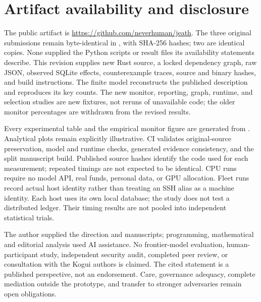\section*{Artifact availability and disclosure}
The public artifact is \url{https://github.com/neverhuman/jeath}. The three original submissions remain byte-identical in , with SHA-256 hashes; two are identical copies. None supplied the Python scripts or result files its availability statements describe. This revision supplies new Rust source, a locked dependency graph, raw JSON, observed SQLite effects, counterexample traces, source and binary hashes, and build instructions. The finite model reconstructs the published description and reproduces its key counts. The new monitor, reporting, graph, runtime, and selection studies are new fixtures, not reruns of unavailable code; the older monitor percentages are withdrawn from the revised results.

Every experimental table and the empirical monitor figure are generated from . Analytical plots remain explicitly illustrative. CI validates original-source preservation, model and runtime checks, generated evidence consistency, and the split manuscript build. Published source hashes identify the code used for each measurement; repeated timings are not expected to be identical. CPU runs require no model API, real funds, personal data, or GPU allocation. Fleet runs record actual host identity rather than treating an SSH alias as a machine identity. Each host uses its own local database; the study does not test a distributed ledger. Their timing results are not pooled into independent statistical trials.

The author supplied the direction and manuscripts; programming, mathematical and editorial analysis used AI assistance. No frontier-model evaluation, human-participant study, independent security audit, completed peer review, or consultation with the Kogui authors is claimed. The cited statement is a published perspective, not an endorsement. Care, governance adequacy, complete mediation outside the prototype, and transfer to stronger adversaries remain open obligations.
